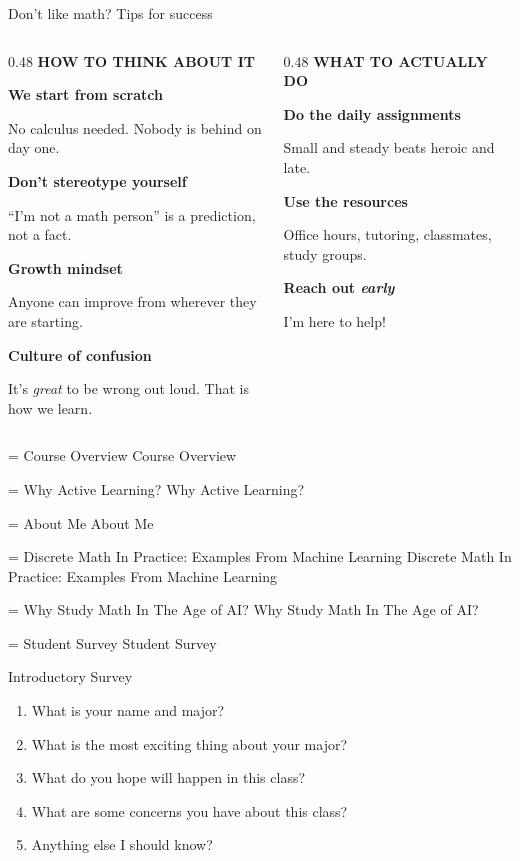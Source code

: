 \documentclass[10pt]{beamer}
\newcounter{agendaindex}
\newcounter{agendacurrent}
\newcommand{\agendatopics}{%
	\agendaentry{Course Overview}%
	\agendaentry{Why Active Learning?}%
	\agendaentry{About Me}%
	\agendaentry{Discrete Math In Practice: Examples From Machine Learning}%
	\agendaentry{Why Study Math In The Age of AI?}%
	\agendaentry{Student Survey}%
}
\newcommand{\agendaentry}[1]{%
	\stepcounter{agendaindex}%
	\ifnum\value{agendaindex}=\value{agendacurrent}%
		\alert{#1}%
	\else
		\textcolor{fg!40!bg}{#1}%
	\fi
	\par\vspace{0.5em}%
}
\newcommand{\agendaframe}[1]{%
	\setcounter{agendacurrent}{#1}%
	\setcounter{agendaindex}{0}%
	\begin{frame}[standout]
		\begin{minipage}{0.92\textwidth}
			\centering
			\agendatopics
		\end{minipage}
	\end{frame}%
}
\newcommand{\tipcard}[4][blue]{%
  \par\medskip\noindent
  \begin{minipage}[t]{0.95cm}\centering{\color{#1!75}\Large #2}\end{minipage}%
  \begin{minipage}[t]{\dimexpr\linewidth-1.05cm\relax}\raggedright
    \textbf{#3}\par{\scriptsize\color{black!70}#4}\par
  \end{minipage}\par
}
\newcommand{\tiphead}[2][blue]{{\color{#1!75}\footnotesize\bfseries\MakeUppercase{#2}}\par\vspace{-2pt}{\color{#1!35}\rule{\linewidth}{1pt}}\par}
\begin{document}
\begin{frame}{Don't like math? Tips for success}

\begin{columns}[T,onlytextwidth]

\begin{column}{0.48\textwidth}
\tiphead[blue]{How to think about it}
\tipcard[blue]{\faSeedling}{We start from scratch}{No calculus needed. Nobody is behind on day one.}
\pause
\tipcard[blue]{\faBrain}{Don't stereotype yourself}{``I'm not a math person'' is a prediction, not a fact.}
\pause
\tipcard[blue]{\faChartLine}{Growth mindset}{Anyone can improve from wherever they are starting.}
\pause
\tipcard[blue]{\faComments}{Culture of confusion}{It's \emph{great} to be wrong out loud. That is how we learn.}
\end{column}

\pause
\begin{column}{0.48\textwidth}
\tiphead[orange]{What to actually do}
\tipcard[orange]{\faCalendarCheck}{Do the daily assignments}{Small and steady beats heroic and late.}
\pause
\tipcard[orange]{\faUsers}{Use the resources}{Office hours, tutoring, classmates, study groups.}
\pause
\tipcard[orange]{\faLifeRing}{Reach out \emph{early}}{I'm here to help!}
\end{column}

\end{columns}

\end{frame}






\agendaframe{6}

\begin{frame}{Introductory Survey}

\begin{enumerate}
	\item What is your name and major?
	\item What is the most exciting thing about your major?
	\item What do you hope will happen in this class?
	\item What are some concerns you have about this class?
	\item Anything else I should know?
\end{enumerate}
	
\end{frame}
\end{document}
